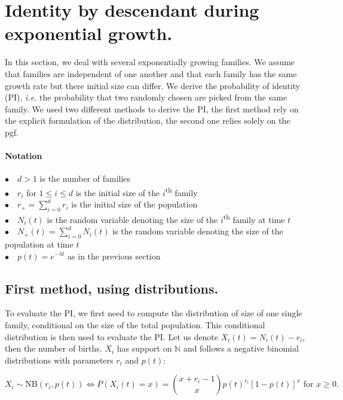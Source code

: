 \documentclass{article}
\begin{document}
 
 \section{Identity by descendant during exponential growth.}
 In this section, we deal with several exponentially growing families. We assume that families are independent of one another and that each family has the same growth rate but there initial size can differ. We derive the probability of identity (PI), \textit{i.e.} the probability that two randomly chosen are picked from the same family. We used two different methods to derive the PI, the first method rely on the explicit formulation of the distribution, the second one relies solely on the pgf.
 \\
  \paragraph{Notation} $ $\\
 $\bullet \quad d>1$ is the number of families\\
 $\bullet \quad r_i $ for $1 \leq i \leq d$ is the initial size of the $i$\textsuperscript{th} family\\
 $\displaystyle \bullet \quad r_+=\sum_{i=0}^d r_i$ is the initial size of the population \\
 $\bullet \quad N_i(t) $ is the random variable denoting the size of the $i$\textsuperscript{th} family at time $t$ \\
 $\displaystyle \bullet \quad N_+(t)=\sum_{i=0}^d N_i(t)$ is the random variable denoting the size of the population at time $t$ \\
 $\bullet \quad p(t)=e^{-\lambda t} $ as in the previous section\\
 
 \subsection{First method, using distributions.}
  To evaluate the PI, we first need to compute the distribution of size of one single family, conditional on the size of the total population. This conditional distribution is then used to evaluate the PI.
 Let us denote $X_i(t)=N_i(t)-r_i$, then the number of births. $X_i$ has support on $\mathbb{N}$ and follows a negative binomial distributions with parameters $r_i$ and $p(t)$:

\begin{equation}
X_i \sim \textrm{NB}(r_i,p(t)) \iff P(X_i(t)=x)=\binom{x+r_i-1}{x} p(t)^{r_i} [1-p(t)]^{x} \text{ for } x \geq 0.
\end{equation}
\end{document}
